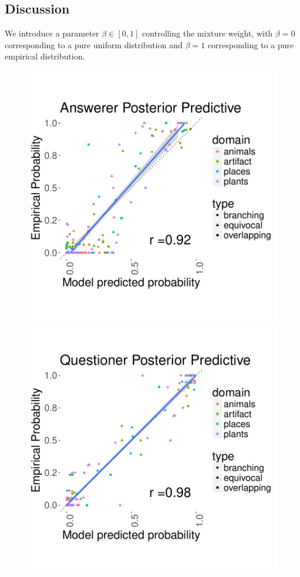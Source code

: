 \documentclass[12pt, floatsintext, jou]{apa6}
\begin{document}
\subsection{Discussion}

We introduce a parameter $\beta \in [0,1]$ controlling the mixture weight, with $\beta = 0$ corresponding to a pure uniform distribution and $\beta = 1$ corresponding to a pure empirical distribution. 

\begin{figure}[t!]
\begin{center}
\includegraphics[scale=.5]{fullAnswerer_Predictives}
\includegraphics[scale=.5]{fullQuestioner_Predictives}

\end{center}
\end{figure}
\end{document}
